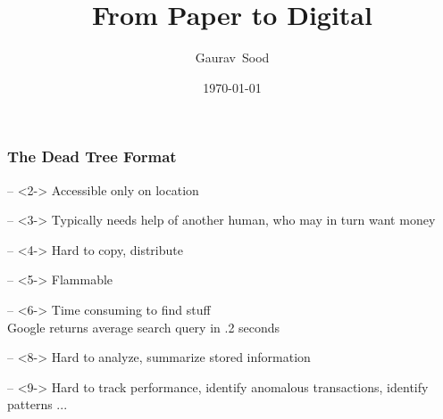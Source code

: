 \documentclass[compress, black]{beamer}
\title[DS]{From Paper to Digital}
\author[Sood]{Gaurav~Sood}
\date[2015]{\today}
\begin{document}
\newcommand{\multilineR}[1]{\begin{tabular}[b]{@{}r@{}}#1\end{tabular}}
\newcommand{\multilineL}[1]{\begin{tabular}[b]{@{}l@{}}#1\end{tabular}}
\newcommand{\multilineC}[1]{\begin{tabular}[b]{@{}c@{}}#1\end{tabular}}

\newenvironment{large_enum}{
\Large
\begin{itemize}
  \setlength{\itemsep}{7pt}
  \setlength{\parskip}{0pt}
  \setlength{\parsep}{0pt}
}{\end{itemize}}

\begin{comment}

	setwd(paste0(basedir, "github/Image-to-Text/ocr/present/"))
	tools::texi2dvi("PaperToDigital.tex", pdf=TRUE,clean=TRUE)
	setwd(basedir)

\end{comment}

 \frame
  {
    \titlepage
  }

\begin{frame}
\frametitle{}
\end{frame}

\begin{frame}
\frametitle{The Dead Tree Format}
	\begin{large_enum}
		\item[--]<2-> Accessible only on location
		\item[--]<3-> Typically needs help of another human, who may in turn want \alert{money} 
		\item[--]<4-> Hard to copy, distribute
		\item[--]<5-> Flammable
		\item[--]<6-> Time consuming to find stuff \\ \normalsize \pause \pause \pause \pause \pause \pause 
					  Google returns average search query in .2 seconds
		\item[--]<8-> Hard to analyze, summarize stored information
		\item[--]<9-> Hard to track performance, identify anomalous transactions, identify patterns ...
 	\end{large_enum}
\end{frame}
\end{document}
